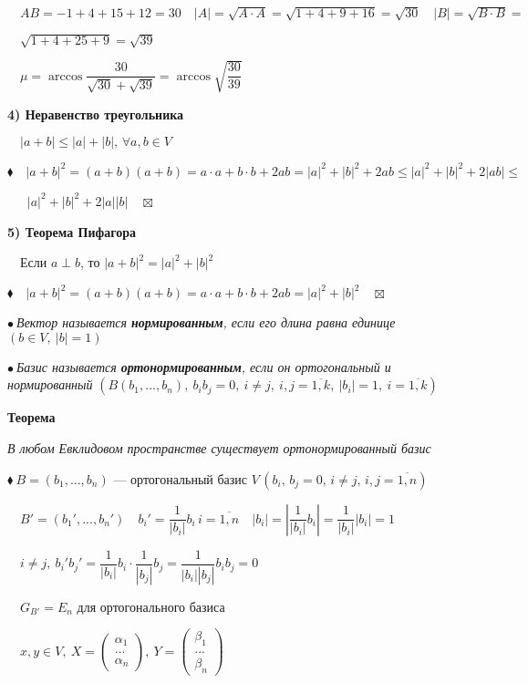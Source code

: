 \documentclass[a4paper, 12pt]{report}
\begin{document}
	$\quad AB=-1+4+15+12=30 \quad |A|=\sqrt{A \cdot A}=\sqrt{1+4+9+16}=\sqrt{30} \quad|B|=\sqrt{B \cdot B}=$
	
	$\quad\sqrt{1+4+25+9}=\sqrt{39} $
	
	$\quad \mu=\arccos{\dfrac{30}{\sqrt{30}+\sqrt{39}}}=\arccos{\sqrt{\dfrac{30}{39}}}$
	\par \bigskip
	\textbf{4) Неравенство треугольника}
	
	$\quad |a+b| \le |a|+|b|, \, \forall a,b \in V$
	\par \bigskip
	$\blacklozenge \quad |a+b|^2=(a+b)(a+b)=a \cdot a+ b \cdot b + 2ab=|a|^2+|b|^2+2ab \le |a|^2+|b|^2+2|ab| \le $
	
	$\quad\ $ $|a|^2+|b|^2 + 2|a||b|  \quad \boxtimes$
	\par \bigskip
	\textbf{5) Теорема Пифагора}
	
	$\quad$Если $a \perp b$, то $|a+b|^2=|a|^2+|b|^2$
	\par \bigskip
	$\blacklozenge \quad |a+b|^2=(a+b)(a+b)=a \cdot a + b \cdot b +2ab=|a|^2+|b|^2  \quad \boxtimes$
	\par \bigskip
	$\bullet\ $\textit{Вектор называется\textbf{ нормированным}, если его длина равна единице}
	$(b \in V,\ |b|=1)$
	\par \bigskip
	$\bullet\ $\textit{Базис называется \textbf{ортонормированным}, если он ортогональный и нормированный}
	$(B(b_1,...,b_n),\ b_i b_j =0,\ i \ne j,\ i,j=\overline{1,k},\ |b_i|=1,\ i=\overline{1,k})$
	\par \bigskip
	\textbf{Теорема}
	
	\textit{В любом Евклидовом пространстве существует ортонормированный базис}
	\par \bigskip
	$\blacklozenge\ B=(b_1,...,b_n)$ --- ортогональный базис $V \, (b_i,\, b_j=0, \, i \ne j, \, i,j=\overline{1,n})$
	
	$\quad B'=(b_1',...,b_n') \quad b_i'=\dfrac{1}{|b_i|}b_i \, i=\overline{1,n} \quad |b_i|=|\dfrac{1}{|b_i|}b_i|=\dfrac{1}{|b_i|}|b_i|=1 $
	
	$\quad i\ne j,\ b_i' b_j'=\dfrac{1}{|b_i|}b_i \cdot \dfrac{1}{|b_j|}b_j=\dfrac{1}{|b_i||b_j|} b_i b_j =0 $
	\par \bigskip
	$\quad G_{B'} = E_n$ для ортогонального базиса
	\par \bigskip
	$\quad x,y \in V,\ X=\begin{pmatrix}
		\alpha_1\\
		...\\
		\alpha_n
	\end{pmatrix}, \ Y=\begin{pmatrix}
		\beta_1\\
		...\\
		\beta_n
	\end{pmatrix} $
	
\end{document}
